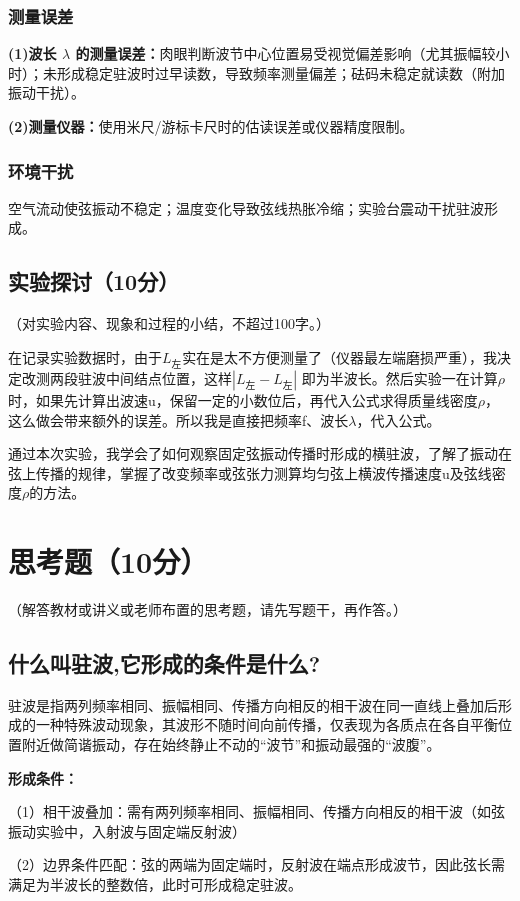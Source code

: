 \documentclass[]{../template/Report}%
\begin{document}
\begin{fullreportonly}
\subsubsection{测量误差}
\textbf{(1)波长 $\lambda$ 的测量误差：}肉眼判断波节中心位置易受视觉偏差影响（尤其振幅较小时）；未形成稳定驻波时过早读数，导致频率测量偏差；砝码未稳定就读数（附加振动干扰）。
\par
\textbf{(2)测量仪器：}使用米尺/游标卡尺时的估读误差或仪器精度限制。

\subsubsection{环境干扰}
空气流动使弦振动不稳定；温度变化导致弦线热胀冷缩；实验台震动干扰驻波形成。

\subsection{实验探讨（10分）}
（对实验内容、现象和过程的小结，不超过100字。）
\par
在记录实验数据时，由于$L_\text{左}$实在是太不方便测量了（仪器最左端磨损严重），我决定改测两段驻波中间结点位置，这样$|L_\text{左} - L_\text{左}|$ 即为半波长。然后实验一在计算$\rho$时，如果先计算出波速u，保留一定的小数位后，再代入公式求得质量线密度$\rho$，这么做会带来额外的误差。所以我是直接把频率f、波长$\lambda$，代入公式。
\par
通过本次实验，我学会了如何观察固定弦振动传播时形成的横驻波，了解了振动在弦上传播的规律，掌握了改变频率或弦张力测算均匀弦上横波传播速度u及弦线密度$\rho$的方法。

\section{思考题（10分）}
（解答教材或讲义或老师布置的思考题，请先写题干，再作答。）
\subsection{什么叫驻波,它形成的条件是什么?}
驻波是指两列频率相同、振幅相同、传播方向相反的相干波在同一直线上叠加后形成的一种特殊波动现象，其波形不随时间向前传播，仅表现为各质点在各自平衡位置附近做简谐振动，存在始终静止不动的“波节”和振动最强的“波腹”。
\par
\textbf{形成条件：}
\par
（1）相干波叠加：需有两列频率相同、振幅相同、传播方向相反的相干波（如弦振动实验中，入射波与固定端反射波）
\par
（2）边界条件匹配：弦的两端为固定端时，反射波在端点形成波节，因此弦长需满足为半波长的整数倍，此时可形成稳定驻波。


\end{fullreportonly}
\end{document}
